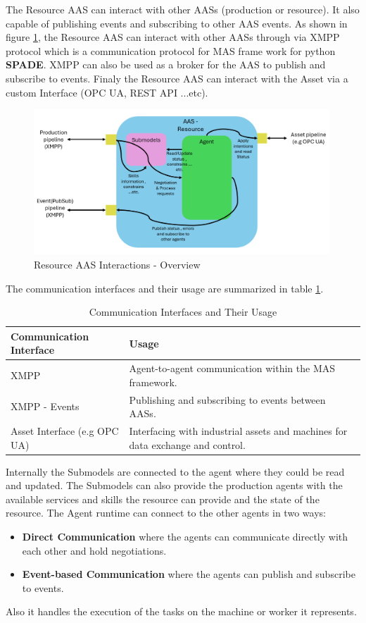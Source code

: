 \newpage
The Resource AAS can interact with other AASs (production or resource).
It also capable of publishing events and subscribing to other AAS events.
As shown in figure \ref{fig:resource_aas_interactions}, the Resource AAS can interact with other AASs through
via XMPP protocol which is a communication protocol for MAS frame work for python \textbf{SPADE}.
XMPP can also be used as a broker for the AAS to publish and subscribe to events.
Finaly the Resource AAS can interact with the Asset via a custom Interface (OPC UA, REST API ...etc).
\begin{figure}[h]
    \centering
    \includegraphics[width=0.99\textwidth]{Images/Resource_Agent_Interaction_Overview.png}
    \caption{Resource AAS Interactions - Overview}
    \label{fig:resource_aas_interactions}
\end{figure}
The communication interfaces and their usage are summarized in table \ref{table:communication_interfaces}.
\begin{table}[h]
\centering
\begin{tabularx}{\textwidth}{>{\raggedright\arraybackslash}X>{\raggedright\arraybackslash}X}
\toprule
\rowcolor[HTML]{38FFF8}
\textbf{Communication Interface} & \textbf{Usage} \\ \midrule
XMPP & Agent-to-agent communication within the MAS framework. \\
XMPP - Events & Publishing and subscribing to events between AASs. \\
Asset Interface (e.g OPC UA) & Interfacing with industrial assets and machines for data exchange and control. \\
\bottomrule
\end{tabularx}
\caption{Communication Interfaces and Their Usage}
\label{table:communication_interfaces}
\end{table}
\newpage
Internally the Submodels are connected to the agent where they could be read and updated.
The Submodels can also provide the production agents with the available services and skills the resource can provide and the state of the resource.
The Agent runtime can connect to the other agents in two ways:
\begin{itemize}
    \item \textbf{Direct Communication} where the agents can communicate directly with each other and hold negotiations.
    \item \textbf{Event-based Communication} where the agents can publish and subscribe to events.
\end{itemize}
Also it handles the execution of the tasks on the machine or worker it represents.

